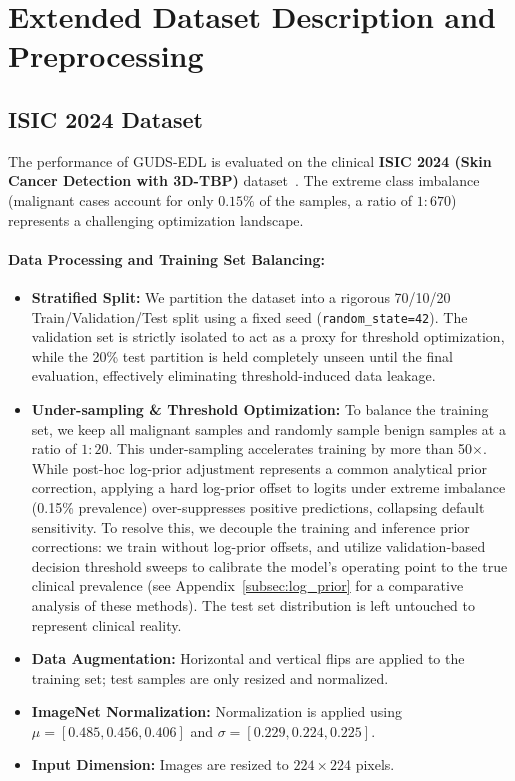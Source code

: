 \documentclass[letterpaper]{article} %
\begin{document}

\section{Extended Dataset Description and Preprocessing}
\subsection{ISIC 2024 Dataset}\label{subsec:isic}

The performance of GUDS-EDL is evaluated on the clinical \textbf{ISIC 2024 (Skin Cancer Detection with 3D-TBP)} dataset~\cite{isic2024,codella2019skin,tschandl2018ham10000}. The extreme class imbalance (malignant cases account for only $0.15\%$ of the samples, a ratio of $1{:}670$) represents a challenging optimization landscape.

\paragraph{Data Processing and Training Set Balancing:}
\begin{itemize}
    \item \textbf{Stratified Split:} We partition the dataset into a rigorous 70/10/20 Train/Validation/Test split using a fixed seed (\texttt{random\_state=42}). The validation set is strictly isolated to act as a proxy for threshold optimization, while the 20\% test partition is held completely unseen until the final evaluation, effectively eliminating threshold-induced data leakage.
    \item \textbf{Under-sampling \& Threshold Optimization:} To balance the training set, we keep all malignant samples and randomly sample benign samples at a ratio of $1:20$. This under-sampling accelerates training by more than 50$\times$. While post-hoc log-prior adjustment represents a common analytical prior correction, applying a hard log-prior offset to logits under extreme imbalance (0.15\% prevalence) over-suppresses positive predictions, collapsing default sensitivity. To resolve this, we decouple the training and inference prior corrections: we train without log-prior offsets, and utilize validation-based decision threshold sweeps to calibrate the model's operating point to the true clinical prevalence (see Appendix~\ref{subsec:log_prior} for a comparative analysis of these methods). The test set distribution is left untouched to represent clinical reality.
    \item \textbf{Data Augmentation:} Horizontal and vertical flips are applied to the training set; test samples are only resized and normalized.
    \item \textbf{ImageNet Normalization:} Normalization is applied using $\mu = [0.485, 0.456, 0.406]$ and $\sigma = [0.229, 0.224, 0.225]$.
    \item \textbf{Input Dimension:} Images are resized to $224 \times 224$ pixels.
\end{itemize}
\end{document}

